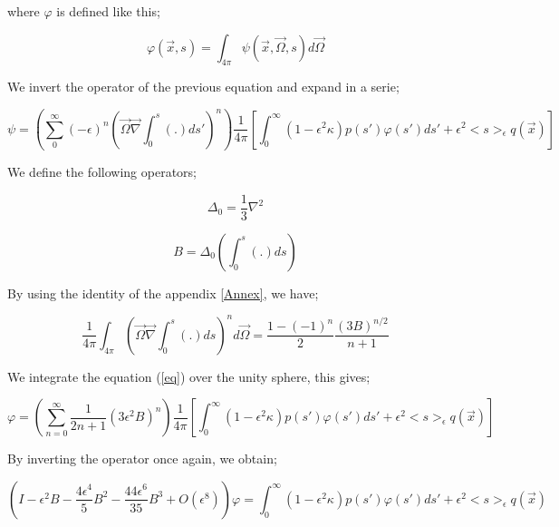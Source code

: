 \documentclass[a4paper, 12pt]{report}
\newcommand{\bl}{\big<}
\newcommand{\bg}{\big>}
\begin{document}
\begin{appendix}
where $\varphi$ is defined like this;

\begin{equation}
\varphi(\vec{x},s) = \int_{4\pi} \psi(\vec{x},\vec{\Omega},s)d\vec{\Omega}
\end{equation}

We invert the operator of the previous equation and expand in a serie;

\begin{equation}\label{eq}
\psi = \left( \sum_0^\infty (-\epsilon)^n \left(\vec{\Omega}\vec{\nabla}\int_0^s (.) ds' \right)^n \right)\frac{1}{4\pi} \left[  \int_0^\infty (1-\epsilon^2 \kappa)p(s')\varphi(s')ds' + \epsilon^2 \bl s \bg_\epsilon q(\vec{x}) \right]
\end{equation}

We define the following operators;

\begin{equation}
\Delta_0 = \frac{1}{3}\nabla^2
\end{equation}

\begin{equation}
B = \Delta_0\left( \int_0^s (.) ds \right)
\end{equation}

By using the identity of the appendix \ref{Annex}, we have;

\begin{equation}
\frac{1}{4\pi}\int_{4\pi} \left( \vec{\Omega}\vec{\nabla}\int_0^s (.)ds \right)^n d\vec{\Omega} = \frac{1-(-1)^n}{2}\frac{(3B)^{n/2}}{n+1}
\end{equation}

We integrate the equation (\ref{eq}) over the unity sphere, this gives;

\begin{equation}\label{eq2}
\varphi = \left( \sum_{n=0}^\infty \frac{1}{2n+1} (3\epsilon^2B)^n \right)\frac{1}{4\pi} \left[   \int_0^\infty (1-\epsilon^2 \kappa)p(s')\varphi(s')ds' + \epsilon^2 \bl s \bg_\epsilon q(\vec{x}) \right]
\end{equation}

By inverting the operator once again, we obtain;

\begin{equation}\label{2}
\left( I - \epsilon^2B - \frac{4\epsilon^4}{5}B^2 -\frac{44\epsilon^6}{35}B^3 + O(\epsilon^8) \right)\varphi = \int_0^\infty (1-\epsilon^2 \kappa)p(s')\varphi(s')ds' + \epsilon^2 \bl s \bg_\epsilon q(\vec{x})
\end{equation}


\end{appendix}
\end{document}

